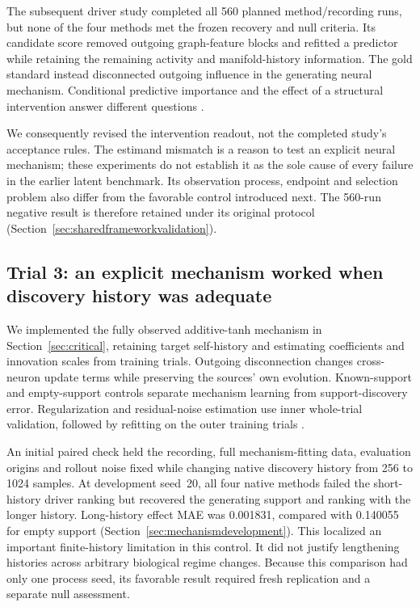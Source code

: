 The subsequent driver study completed all 560 planned method/recording runs,
but none of the four methods met the frozen recovery and null criteria. Its
candidate score removed outgoing graph-feature blocks and refitted a predictor
while retaining the remaining activity and manifold-history information. The
gold standard instead disconnected outgoing influence in the generating neural
mechanism. Conditional predictive importance and the effect of a structural
intervention answer different questions
\citep{williamson2023importance,pearl2010causalinference}.

We consequently revised the intervention readout, not the completed study's
acceptance rules. The estimand mismatch is a reason to test an explicit neural
mechanism; these experiments do not establish it as the sole cause of every
failure in the earlier latent benchmark. Its observation process, endpoint and
selection problem also differ from the favorable control introduced next. The
560-run negative result is therefore retained under its original protocol
(Section~\ref{sec:sharedframeworkvalidation}).

\subsection{Trial 3: an explicit mechanism worked when discovery history was adequate}

We implemented the fully observed additive-tanh mechanism in
Section~\ref{sec:critical}, retaining target self-history and estimating
coefficients and innovation scales from training trials. Outgoing disconnection
changes cross-neuron update terms while preserving the sources' own evolution.
Known-support and empty-support controls separate mechanism learning from
support-discovery error. Regularization and residual-noise estimation use inner
whole-trial validation, followed by refitting on the outer training trials
\citep{hoerl1970ridge,cawley2010overfitting}.

An initial paired check held the recording, full mechanism-fitting data,
evaluation origins and rollout noise fixed while changing native discovery
history from 256 to 1024 samples. At development seed~20, all four native
methods failed the short-history driver ranking but recovered the generating
support and ranking with the longer history. Long-history effect MAE was
0.001831, compared with 0.140055 for empty support
(Section~\ref{sec:mechanismdevelopment}). This localized an important
finite-history limitation in this control. It did not justify lengthening
histories across arbitrary biological regime changes. Because this comparison
had only one process seed, its favorable result required fresh replication
and a separate null assessment.

